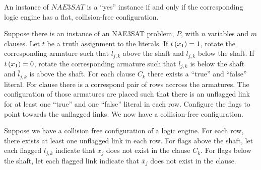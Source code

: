 % 
\begin{thm}\label{thm:Satisfiability-1}
 An instance of $NAE3SAT$ is a ``yes'' instance if and only if the corresponding logic engine has a
flat, collision-free configuration.
\end{thm}
\begin{pf}
Suppose there is an instance of an NAE3SAT problem, $P$, with $n$ variables and $m$ clauses.  Let 
$t$ be a truth assignment to the literals.  If $t \left( x_1 \right) = 1$, rotate the corresponding armature 
such that $l_{j,k}$ above the shaft and $\bar{l}_{j,k}$ below the shaft.  If $t \left( x_1 \right) = 0$, 
rotate the corresponding armature such that $l_{j,k}$ is below the shaft and $\bar{l}_{j,k}$ is 
above the shaft.  For each clause $C_k$ there exists a ``true'' and ``false'' literal.  For clause 
there is a correspond pair of rows accross the armatures.  The configuration of those armatures are 
placed such that there is an unflagged link for at least one ``true'' and one ``false'' literal in 
each row.  Configure the flags to point towards the unflagged links. We now have a collision-free 
configuration.

Suppose we have a collision free configuration of a logic engine.  For each row, there exists at 
least one unflagged link in each row.  For flags above the shaft, let each flagged $l_{j,k}$ 
indicate that $x_j$ does not exist in the clause $C_k$.  For flags below the shaft, let each 
flagged link indicate that $\bar{x}_j$ does not exist in the clause.  
\end{pf}
